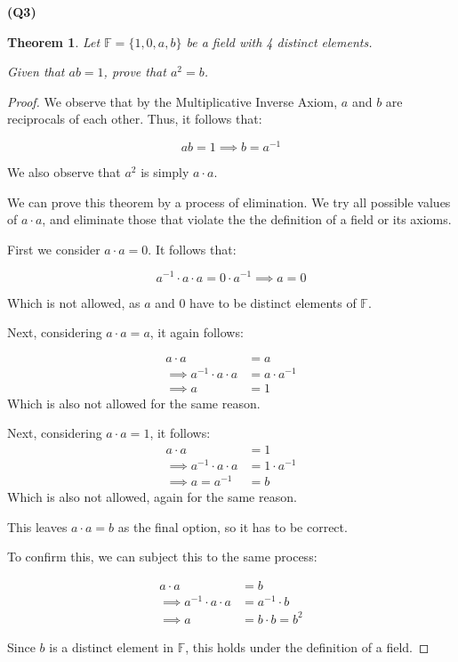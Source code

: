 \documentclass[12pt, a4paper]{article}
\newcommand{\F}{\mathbb{F}}
\newtheorem{theorem}{Theorem}
\begin{document}
\noindent\textbf{(Q3)}

\begin{theorem}
    Let $\F = \{1, 0, a, b\}$ be a field with 4 distinct elements.

    Given that $ab = 1$, prove that $a^2 = b$.
\end{theorem}

\begin{proof}
    We observe that by the Multiplicative Inverse Axiom, $a$ and $b$ are reciprocals
    of each other. Thus, it follows that:

    \[
        ab = 1 \implies b = a^{-1}
    \]

    We also observe that $a^2$ is simply $a \cdot a$.

    We can prove this theorem by a process of elimination. We try all possible values
    of $a \cdot a$, and eliminate those that violate the the definition of a field
    or its axioms.

    First we consider $a \cdot a = 0$. It follows that:

    \[
        a^{-1} \cdot a \cdot a = 0 \cdot a^{-1} \implies a = 0
    \]

    Which is not allowed, as $a$ and $0$ have to be distinct elements of $\F$.

    Next, considering $a \cdot a = a$, it again follows:

    \begin{align*}
        a \cdot a & = a \\
        \implies a^{-1} \cdot a \cdot a & = a \cdot a^{-1}\\
        \implies a & = 1
    \end{align*}
    Which is also not allowed for the same reason.

    Next, considering $a \cdot a = 1$, it follows:
    \begin{align*}
        a \cdot a & = 1\\
        \implies a^{-1} \cdot a \cdot a & = 1 \cdot a^{-1}\\
        \implies a = a^{-1} & = b
    \end{align*}
    Which is also not allowed, again for the same reason.

    This leaves $a \cdot a = b$ as the final option, so it has to be correct.

    To confirm this, we can subject this to the same process:

    \begin{align*}
        a \cdot a & = b\\
        \implies a^{-1} \cdot a \cdot a & = a^{-1} \cdot b\\
        \implies a & = b \cdot b = b^{2}
    \end{align*}

    Since $b$ is a distinct element in $\F$, this holds under the definition of a field.

\end{proof}
\end{document}
